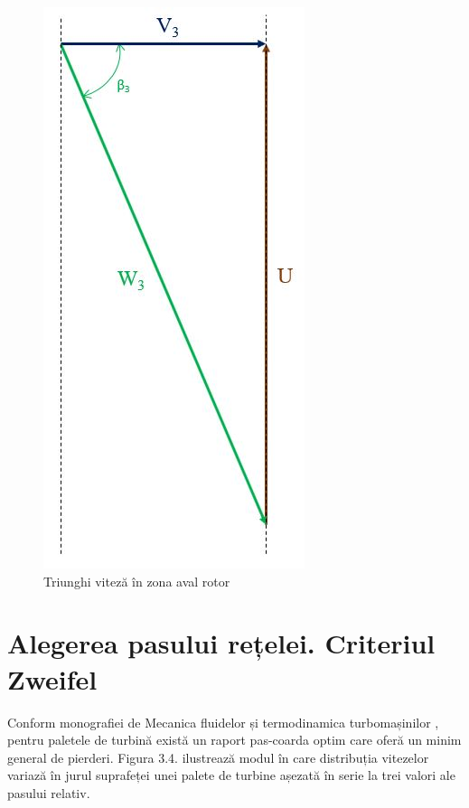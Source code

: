 \begin{figure}[h]
	\centering
	\includegraphics[scale=0.55]{figures/triunghi_viteza_ZAR.jpg}
	\caption{Triunghi viteză în zona aval rotor}
	\label{Triunghi viteză în zona aval rotor}
\end{figure}

\clearpage

\section{Alegerea pasului rețelei. Criteriul Zweifel}

Conform monografiei de Mecanica fluidelor și termodinamica turbomașinilor \cite{hall2013fluid}, pentru paletele de turbină există un raport pas-coarda optim care oferă un minim general de pierderi. Figura 3.4. ilustrează modul în care distribuția vitezelor variază în jurul suprafeței unei palete de turbine așezată în serie la trei valori ale pasului relativ.

